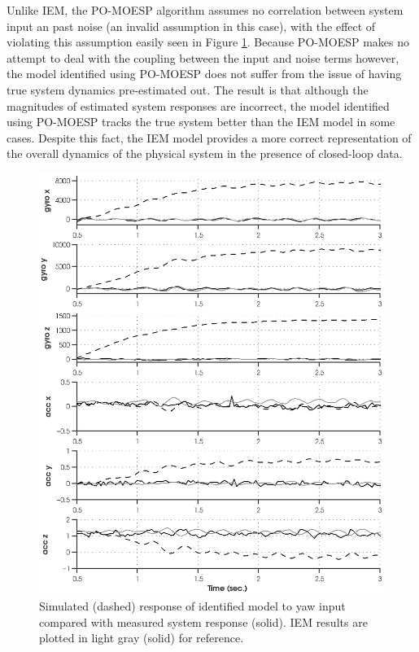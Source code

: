 Unlike IEM, the PO-MOESP algorithm assumes no correlation between system input an past noise (an invalid assumption in this case), with the effect of violating this assumption easily seen in Figure \ref{sim_1760_moesp.eps}. Because PO-MOESP makes no attempt to deal with the coupling between the input and noise terms however, the model identified using PO-MOESP does not suffer from the issue of having true system dynamics pre-estimated out. The result is that although the magnitudes of estimated system responses are incorrect, the model identified using PO-MOESP tracks the true system better than the IEM model in some cases. Despite this fact, the IEM model provides a more correct representation of the overall dynamics of the physical system in the presence of closed-loop data.

\newpage
\begin{figure}[htb!]
	\centering
	\includegraphics{../fig/sim_1760_moesp.eps}
	\caption{Simulated (dashed) response of identified model to yaw input compared with measured system response (solid). IEM results are plotted in light gray (solid) for reference.}
	\label{sim_1760_moesp.eps}
\end{figure}\clearpage











